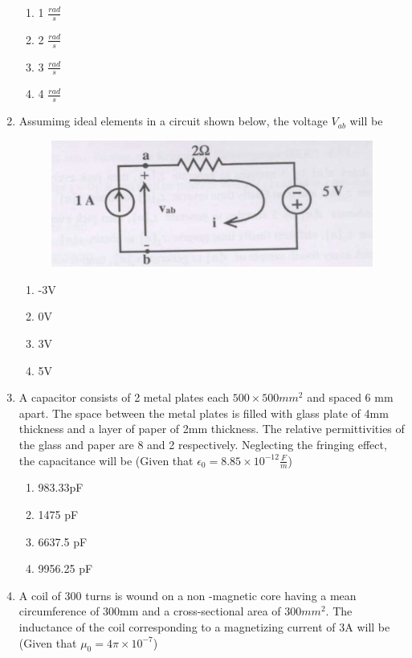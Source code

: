 \documentclass[journal,12pt,onecolumn]{IEEEtran}
\theoremstyle{remark}
\begin{document}
\begin{enumerate}
\begin{enumerate}
           \item 1 $\frac{rad}{s}$
           \item 2 $\frac{rad}{s}$
	   \item 3 $\frac{rad}{s}$
           \item 4 $\frac{rad}{s}$
       \end{enumerate}
       \item Assumimg ideal elements in a circuit shown below, the voltage $V_{ab}$ will be\\
       \begin{figure}[h!]
       \centering
       \includegraphics[width=0.7\linewidth]{figs/fig3.jpg}
       \label{fig:11011}
       \end{figure}
       \begin{enumerate}
           \item -3V
           \item 0V
           \item 3V
           \item 5V
       \end{enumerate}
       \item A capacitor consists of 2 metal plates each $500 \times 500 mm^2$ and spaced 6 mm apart. The space between the metal plates is filled with glass plate of 4mm thickness and a layer of paper of 2mm thickness. The relative permittivities of the glass and paper are 8 and 2 respectively. Neglecting the fringing effect, the capacitance will be (Given that $\epsilon_{0}=8.85\times 10^{-12}\frac{F}{m}$)
       \begin{enumerate}
           \item 983.33pF
           \item 1475 pF
           \item 6637.5 pF
           \item 9956.25 pF
       \end{enumerate}
      \item A coil of 300 turns is wound on a non -magnetic core having a mean circumference of 300mm and a cross-sectional area of $300 mm^2$. The inductance of the coil corresponding to a magnetizing current of 3A will be (Given that $\mu_0=4\pi\times10^{-7}$)

\end{enumerate}
\end{document}
